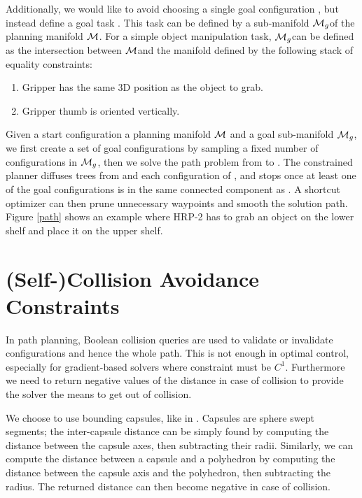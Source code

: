 Additionally, we would like to avoid choosing a single goal
configuration , but instead define a goal task
. This task can be defined by a sub-manifold
$\mathcal{M}_{g}$\thinspace of the planning manifold $\mathcal{M}$. For a
simple object manipulation task, $\mathcal{M}_{g}$\thinspace can be
defined as the intersection between $\mathcal{M}$\thinspace and the
manifold defined by the following stack of equality constraints:

\begin{enumerate}
  \item Gripper has the same 3D position as the object to grab.
  \item Gripper thumb is oriented vertically.
\end{enumerate}

Given a start configuration  a planning manifold $\mathcal{M}$
and a goal sub-manifold $\mathcal{M}_{g}$, we first create a set of goal
configurations  by sampling a fixed number of configurations
in $\mathcal{M}_{g}$, then we solve the path problem from  to
. The constrained planner diffuses trees from  and
each configuration of , and stops once at least one of the
goal configurations is in the same connected component as
. A shortcut optimizer can then prune unnecessary waypoints
and smooth the solution path. Figure \ref{path} shows an example where
HRP-2 has to grab an object on the lower shelf and place it on the
upper shelf.

\section{(Self-)Collision Avoidance Constraints}
\label{distance-constraints}
In path planning, Boolean collision queries are used to validate or
invalidate configurations and hence the whole path. This is not enough
in optimal control, especially for gradient-based solvers where
constraint must be $C^1$. Furthermore we need to return negative
values of the distance in case of collision to provide the solver the
means to get out of collision.

We choose to use bounding capsules, like in
\cite{Kanoun2011}. Capsules are sphere swept segments; the
inter-capsule distance can be simply found by computing the distance
between the capsule axes, then subtracting their radii. Similarly, we
can compute the distance between a capsule and a polyhedron by
computing the distance between the capsule axis and the polyhedron,
then subtracting the radius. The returned distance can then become
negative in case of collision.

